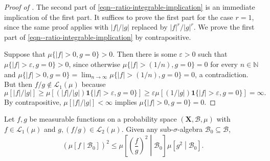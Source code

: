 \begin{proof}[Proof of ]
The second part of \eqref{eqn--ratio-integrable-implication} is an immediate
implication of the first part.
It suffices to prove the first part for the case \(r = 1\), since the same proof
applies with \(|f| / |g|\) replaced by \(|f|^{r} / |g|^{r}\).
We prove the first part of \eqref{eqn--ratio-integrable-implication} by
contrapositive.

Suppose that \(\mu \{|f| > 0, g = 0\} > 0\).
Then there is some \(\varepsilon > 0\) such that \(\mu \{|f| >
\varepsilon, g = 0\} > 0\), since otherwise \(\mu \{|f| > (1 / n), g
= 0\} = 0\) for every \(n \in \mathbb{N}\) and \(\mu \{|f| > 0, g = 0\} =
\lim_{n \to \infty} \mu \{|f| > (1 / n), g = 0\} = 0\), a contradiction.
But then \(f / g \not\in \mathscr{L}_{1} (\mu)\) because
\begin{equation*}
  \mu [|f| / |g|] \geq \mu [(|f| / |g|) \mathbf{1} \{|f| > \varepsilon, g = 0\}]
  \geq \varepsilon \mu [(1 / |g|) \mathbf{1} \{|f| > \varepsilon, g = 0\}] =
  \infty.
\end{equation*}
By contrapositive, \(\mu [|f| / |g|] < \infty\) implies \(\mu \{|f| > 0, g = 0\}
= 0\).
\end{proof}

\begin{lemma}
\label{lem--integral-of-ratio-squared-inequality}
Let \(f, g\) be measurable functions on a probability space \((\mathbf{X},
\mathcal{B}, \mu)\) with \(f \in \mathscr{L}_{1} (\mu)\) and \(g, (f / g) \in
\mathscr{L}_{2} (\mu)\).
Given any sub-\(\sigma\)-algebra \(\mathcal{B}_{0} \subseteq \mathcal{B}\),
\begin{equation}
  \left( \mu \left[ f \middle| \mathcal{B}_{0} \right] \right)^{2} \leq
  \mu \left[ \left( \frac{f}{g} \right)^{2} \middle| \mathcal{B}_{0} \right]
  \mu \left[ g^{2} \middle| \mathcal{B}_{0} \right].
  \label{eqn--integral-of-ratio-squared-inequality}
\end{equation}
\end{lemma}

